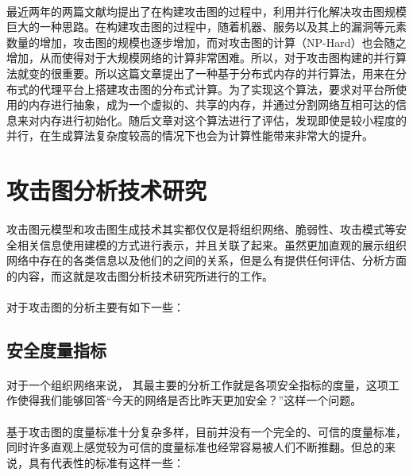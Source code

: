 \documentclass[12pt,a4paper]{article}
\begin{document}
\paragraph{}
最近两年的两篇文献\cite{14}\cite{15}均提出了在构建攻击图的过程中，利用并行化解决攻击图规模巨大的一种思路。在构建攻击图的过程中，随着机器、服务以及其上的漏洞等元素数量的增加，攻击图的规模也逐步增加，而对攻击图的计算（NP-Hard）也会随之增加，从而使得对于大规模网络的计算非常困难。所以，对于攻击图构建的并行算法就变的很重要。所以这篇文章提出了一种基于分布式内存的并行算法，用来在分布式的代理平台上搭建攻击图的分布式计算。为了实现这个算法，要求对平台所使用的内存进行抽象，成为一个虚拟的、共享的内存，并通过分割网络互相可达的信息来对内存进行初始化。随后文章对这个算法进行了评估，发现即使是较小程度的并行，在生成算法复杂度较高的情况下也会为计算性能带来非常大的提升。

\section{攻击图分析技术研究}
\paragraph{}
攻击图元模型和攻击图生成技术其实都仅仅是将组织网络、脆弱性、攻击模式等安全相关信息使用建模的方式进行表示，并且关联了起来。虽然更加直观的展示组织网络中存在的各类信息以及他们的之间的关系，但是么有提供任何评估、分析方面的内容，而这就是攻击图分析技术研究所进行的工作。

\paragraph{}
对于攻击图的分析主要有如下一些：

\subsection{安全度量指标}
\paragraph{}
对于一个组织网络来说， 其最主要的分析工作就是各项安全指标的度量，这项工作使得我们能够回答“今天的网络是否比昨天更加安全？”这样一个问题。
\paragraph{}
基于攻击图的度量标准十分复杂多样，目前并没有一个完全的、可信的度量标准，同时许多直观上感觉较为可信的度量标准也经常容易被人们不断推翻。但总的来说，具有代表性的标准有这样一些：
\end{document}
